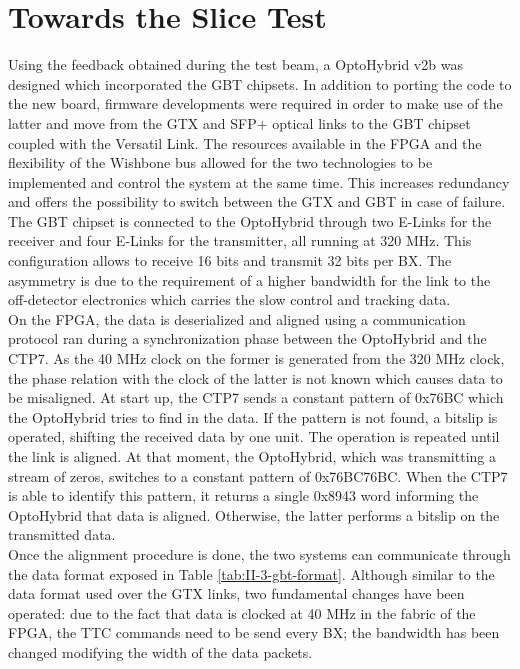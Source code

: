   \section{Towards the Slice Test}

    Using the feedback obtained during the test beam, a OptoHybrid v2b was designed which incorporated the GBT chipsets. In addition to porting the code to the new board, firmware developments were required in order to make use of the latter and move from the GTX and SFP+ optical links to the GBT chipset coupled with the Versatil Link. The resources available in the FPGA and the flexibility of the Wishbone bus allowed for the two technologies to be implemented and control the system at the same time. This increases redundancy and offers the possibility to switch between the GTX and GBT in case of failure. \\

    The GBT chipset is connected to the OptoHybrid through two E-Links for the receiver and four E-Links for the transmitter, all running at 320 MHz. This configuration allows to receive 16 bits and transmit 32 bits per BX. The asymmetry is due to the requirement of a higher bandwidth for the link to the off-detector electronics which carries the slow control and tracking data. \\

    On the FPGA, the data is deserialized and aligned using a communication protocol ran during a synchronization phase between the OptoHybrid and the CTP7. As the 40 MHz clock on the former is generated from the 320 MHz clock, the phase relation with the clock of the latter is not known which causes data to be misaligned. At start up, the CTP7 sends a constant pattern of 0x76BC which the OptoHybrid tries to find in the data. If the pattern is not found, a bitslip is operated, shifting the received data by one unit. The operation is repeated until the link is aligned. At that moment, the OptoHybrid, which was transmitting a stream of zeros, switches to a constant pattern of 0x76BC76BC. When the CTP7 is able to identify this pattern, it returns a single 0x8943 word informing the OptoHybrid that data is aligned. Otherwise, the latter performs a bitslip on the transmitted data. \\

    Once the alignment procedure is done, the two systems can communicate through the data format exposed in Table \ref{tab:II-3-gbt-format}. Although similar to the data format used over the GTX links, two fundamental changes have been operated: due to the fact that data is clocked at 40 MHz in the fabric of the FPGA, the TTC commands need to be send every BX; the bandwidth has been changed modifying the width of the data packets. \\

